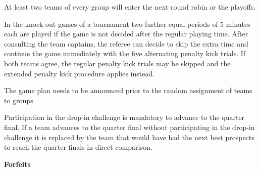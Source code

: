 \bigskip


At least two teams of every group will enter the next round robin or the playoffs.

\bigskip

In the knock-out games of a tournament two further equal periods of 5 minutes each are played if the game is not decided after the regular playing time.  After consulting the team captains, the referee can decide to skip the extra time and continue the game immediately with the five alternating penalty kick trials. If both teams agree, the regular penalty kick trials may be skipped and the extended penalty kick procedure applies instead.

\bigskip


The game plan needs to be announced prior to the random assignment of teams to groups.


\bigskip

Participation in the drop-in challenge is mandatory to advance to the quarter final. If a team advances to the quarter final without participating in the drop-in challenge it is replaced by the team that would have had the next best prospects to reach the quarter finals in direct comparison.

\bigskip

{\bfseries Forfeits}

\headlinebox

